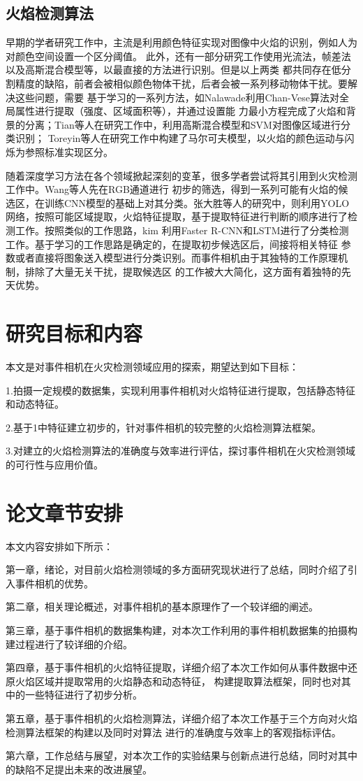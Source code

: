 \subsection{火焰检测算法}

早期的学者研究工作中，主流是利用颜色特征实现对图像中火焰的识别，例如人为对颜色空间设置一个区分阈值\cite{celik2007fire}。
此外，还有一部分研究工作使用光流法，帧差法以及高斯混合模型等，以最直接的方法进行识别。但是以上两类
都共同存在低分割精度的缺陷，前者会被相似颜色物体干扰，后者会被一系列移动物体干扰。要解决这些问题，需要
基于学习的一系列方法，如Nalawade\cite{sruthiautoadaptive}利用Chan-Vese算法对全局属性进行提取（强度、区域面积等），并通过设置能
力最小方程完成了火焰和背景的分离；Tian等人\cite{tian2011smoke}在研究工作中，利用高斯混合模型和SVM对图像区域进行分类识别；
Toreyin等人\cite{toreyin2007online}在研究工作中构建了马尔可夫模型，以火焰的颜色运动与闪烁为参照标准实现区分。

随着深度学习方法在各个领域掀起深刻的变革，很多学者尝试将其引用到火灾检测工作中。Wang等人\cite{wang2016fire}先在RGB通道进行
初步的筛选，得到一系列可能有火焰的候选区，在训练CNN模型的基础上对其分类。张大胜等人\cite{zds}的研究中，则利用YOLO
网络，按照可能区域提取，火焰特征提取，基于提取特征进行判断的顺序进行了检测工作。按照类似的工作思路，kim\cite{kim2019video}
利用Faster R-CNN和LSTM进行了分类检测工作。基于学习的工作思路是确定的，在提取初步候选区后，间接将相关特征
参数或者直接将图象送入模型进行分类识别。而事件相机由于其独特的工作原理机制，排除了大量无关干扰，提取候选区
的工作被大大简化，这方面有着独特的先天优势。

\section{研究目标和内容}

本文是对事件相机在火灾检测领域应用的探索，期望达到如下目标：

1.拍摄一定规模的数据集，实现利用事件相机对火焰特征进行提取，包括静态特征和动态特征。

2.基于1中特征建立初步的，针对事件相机的较完整的火焰检测算法框架。

3.对建立的火焰检测算法的准确度与效率进行评估，探讨事件相机在火灾检测领域的可行性与应用价值。

\section{论文章节安排}

本文内容安排如下所示：

第一章，绪论，对目前火焰检测领域的多方面研究现状进行了总结，同时介绍了引入事件相机的优势。

第二章，相关理论概述，对事件相机的基本原理作了一个较详细的阐述。

第三章，基于事件相机的数据集构建，对本次工作利用的事件相机数据集的拍摄构建过程进行了较详细的介绍。

第四章，基于事件相机的火焰特征提取，详细介绍了本次工作如何从事件数据中还原火焰区域并提取常用的火焰静态和动态特征，
构建提取算法框架，同时也对其中的一些特征进行了初步分析。

第五章，基于事件相机的火焰检测算法，详细介绍了本次工作基于三个方向对火焰检测算法框架的构建以及同时对算法
进行的准确度与效率上的客观指标评估。

第六章，工作总结与展望，对本次工作的实验结果与创新点进行总结，同时对其中的缺陷不足提出未来的改进展望。
